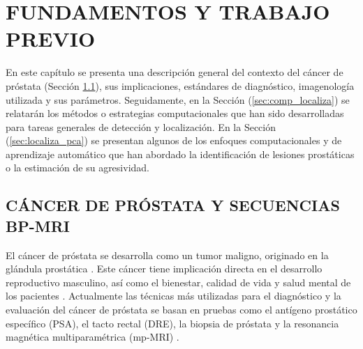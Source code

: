 
\chapter{FUNDAMENTOS Y TRABAJO PREVIO}


En este capítulo se presenta una descripción general del contexto del cáncer de próstata  (Sección \ref{sec:diagnostico}), sus implicaciones, estándares de diagnóstico, imagenología utilizada y sus parámetros. Seguidamente, en la Sección (\ref{sec:comp_localiza}) se relatarán los métodos o estrategias computacionales que han sido desarrolladas para tareas generales de detección y localización. En la Sección (\ref{sec:localiza_pca}) se presentan algunos de los enfoques computacionales y de aprendizaje automático que han abordado la identificación de lesiones prostáticas o la estimación de su agresividad.

\section{CÁNCER DE PRÓSTATA Y SECUENCIAS BP-MRI} \label{sec:diagnostico}
El cáncer de próstata se desarrolla como un tumor maligno, originado en la glándula prostática . Este cáncer tiene implicación directa en el desarrollo reproductivo masculino, así como el bienestar, calidad de vida y salud mental de los pacientes . Actualmente las técnicas más utilizadas para el diagnóstico y la evaluación del cáncer de próstata se basan en pruebas como el antígeno prostático específico (PSA), el tacto rectal (DRE), la biopsia de próstata  y la resonancia magnética multiparamétrica (mp-MRI) .\par

